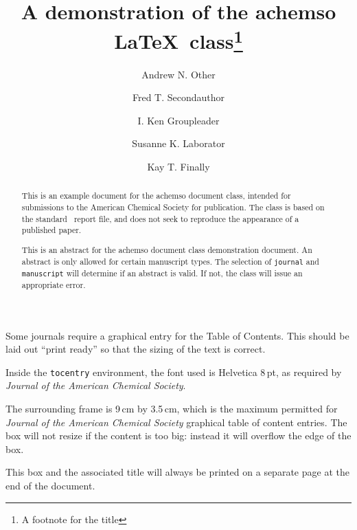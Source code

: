 \documentclass[journal=jacsat,manuscript=communication]{achemso}
\author{Andrew N. Other}
\author{Fred T. Secondauthor}
\author{I. Ken Groupleader}
\affiliation[Unknown University]
{Department of Chemistry, Unknown University, Unknown Town}
\author{Susanne K. Laborator}
\affiliation[BigPharma]
{Lead Discovery, BigPharma, Big Town, USA}
\author{Kay T. Finally}
\affiliation[Unknown University]
{Department of Chemistry, Unknown University, Unknown Town}
\title[An \textsf{achemso} demo]
  {A demonstration of the \textsf{achemso} \LaTeX\
   class\footnote{A footnote for the title}}
\begin{document}
\begin{tocentry}

Some journals require a graphical entry for the Table of Contents.
This should be laid out ``print ready'' so that the sizing of the
text is correct.

Inside the \texttt{tocentry} environment, the font used is Helvetica
8\,pt, as required by \emph{Journal of the American Chemical
Society}.

The surrounding frame is 9\,cm by 3.5\,cm, which is the maximum
permitted for  \emph{Journal of the American Chemical Society}
graphical table of content entries. The box will not resize if the
content is too big: instead it will overflow the edge of the box.

This box and the associated title will always be printed on a
separate page at the end of the document.

\end{tocentry}

\begin{abstract}
  This is an example document for the \textsf{achemso} document
  class, intended for submissions to the American Chemical Society
  for publication. The class is based on the standard \LaTeXe\
  \textsf{report} file, and does not seek to reproduce the appearance
  of a published paper.

  This is an abstract for the \textsf{achemso} document class
  demonstration document.  An abstract is only allowed for certain
  manuscript types.  The selection of \texttt{journal} and
  \texttt{manuscript} will determine if an abstract is valid.  If
  not, the class will issue an appropriate error.
\end{abstract}

\end{document}

